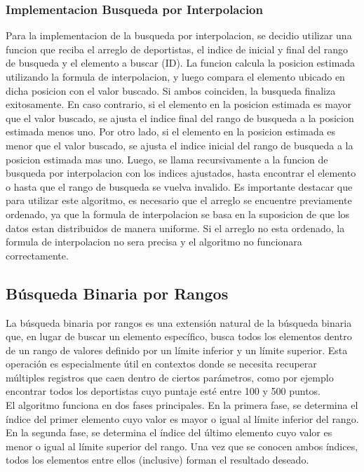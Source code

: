 \subsubsection{Implementacion Busqueda por Interpolacion}
Para la implementacion de la busqueda por interpolacion, se decidio utilizar una funcion que reciba el arreglo de deportistas, el indice de inicial y final del 
rango de busqueda y el elemento a buscar (ID).  La funcion calcula la posicion estimada utilizando la formula de interpolacion, y luego compara el elemento ubicado 
en dicha posicion con el valor buscado.  Si ambos coinciden, la busqueda finaliza exitosamente.  En caso contrario, si el elemento en la posicion estimada es mayor 
que el valor buscado, se ajusta el indice final del rango de busqueda a la posicion estimada menos uno.  Por otro lado, si el elemento en la posicion estimada es 
menor que el valor buscado, se ajusta el indice inicial del rango de busqueda a la posicion estimada mas uno.  Luego, se llama recursivamente a la funcion de 
busqueda por interpolacion con los indices ajustados, hasta encontrar el elemento o hasta que el rango de busqueda se vuelva invalido. Es importante destacar 
que para utilizar este algoritmo, es necesario que el arreglo se encuentre previamente ordenado, ya que la formula de interpolacion se basa en la suposicion de que 
los datos estan distribuidos de manera uniforme.  Si el arreglo no esta ordenado, la formula de interpolacion no sera precisa y el algoritmo no funcionara correctamente. 

\subsection{Búsqueda Binaria por Rangos}

La búsqueda binaria por rangos es una extensión natural de la búsqueda binaria que, en lugar de buscar un elemento específico, busca todos los elementos dentro de un rango de valores definido por un límite inferior y un límite superior.  Esta operación es especialmente útil en contextos donde se necesita recuperar múltiples registros que caen dentro de ciertos parámetros, como por ejemplo encontrar todos los deportistas cuyo puntaje esté entre 100 y 500 puntos. \\

El algoritmo funciona en dos fases principales. En la primera fase, se determina el índice del primer elemento cuyo valor es mayor o igual al límite inferior del rango. En la segunda fase, se determina el índice del último elemento cuyo valor es menor o igual al límite superior del rango. Una vez que se conocen ambos índices, todos los elementos entre ellos (inclusive) forman el resultado deseado. \\

